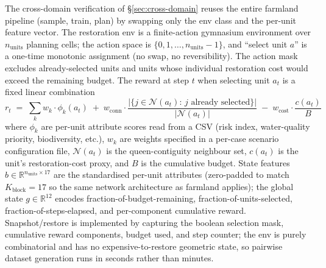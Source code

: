 \documentclass[11pt]{article}
\begin{document}
The cross-domain verification of \S\ref{sec:cross-domain} reuses the entire farmland pipeline (sample, train, plan) by swapping only the env class and the per-unit feature vector. The restoration env is a finite-action gymnasium environment over $n_{\text{units}}$ planning cells; the action space is $\{0, 1, \ldots, n_{\text{units}}-1\}$, and ``select unit $a$'' is a one-time monotonic assignment (no swap, no reversibility). The action mask excludes already-selected units and units whose individual restoration cost would exceed the remaining budget. The reward at step $t$ when selecting unit $a_t$ is a fixed linear combination
\begin{equation*}
r_t \;=\; \sum_{k} w_k \cdot \phi_k(a_t)\;+\;w_{\text{conn}} \cdot \frac{|\{j \in \mathcal{N}(a_t):\,j\text{ already selected}\}|}{|\mathcal{N}(a_t)|}\;-\;w_{\text{cost}} \cdot \frac{c(a_t)}{B}
\end{equation*}
where $\phi_k$ are per-unit attribute scores read from a CSV (risk index, water-quality priority, biodiversity, etc.), $w_k$ are weights specified in a per-case scenario configuration file, $\mathcal{N}(a_t)$ is the queen-contiguity neighbour set, $c(a_t)$ is the unit's restoration-cost proxy, and $B$ is the cumulative budget. State features $b \in \mathbb{R}^{n_{\text{units}} \times 17}$ are the standardised per-unit attributes (zero-padded to match $K_{\text{block}}=17$ so the same network architecture as farmland applies); the global state $g \in \mathbb{R}^{12}$ encodes fraction-of-budget-remaining, fraction-of-units-selected, fraction-of-steps-elapsed, and per-component cumulative reward. Snapshot/restore is implemented by capturing the boolean selection mask, cumulative reward components, budget used, and step counter; the env is purely combinatorial and has no expensive-to-restore geometric state, so pairwise dataset generation runs in seconds rather than minutes.
\end{document}
